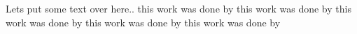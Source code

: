 \documentclass[11pt,fleqn]{article}
\begin{document}


Lets put some text over here..
this work was done by \cite{Cockburn:1989:TRL:69978.69982}
this work was done by \cite{Cockburn:2002:RDG:513457.513458}
this work was done by \cite{Hesthaven:2010:NDG:1952159}
this work was done by \cite{Ni:2008:DSB:1365099.1365353}
this work was done by \cite{Qiu:2005:RDG:1046640.1046665}



\end{document}
